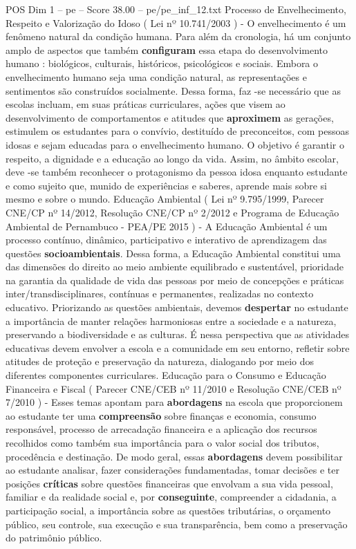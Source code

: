 \begin{textsample}{POS Dim 1 – pe – Score 38.00 – pe/pe\_inf\_12.txt}
Processo de Envelhecimento, Respeito e Valorização do Idoso ( Lei nº 10.741/2003 ) - O envelhecimento é um fenômeno natural da condição humana.
Para além da cronologia, há um conjunto amplo de aspectos que também \textbf{configuram} essa etapa do desenvolvimento humano : biológicos, culturais, históricos, psicológicos e sociais.
Embora o envelhecimento humano seja uma condição natural, as representações e sentimentos são construídos socialmente.
Dessa forma, faz -se necessário que as escolas incluam, em suas práticas curriculares, ações que visem ao desenvolvimento de comportamentos e atitudes que \textbf{aproximem} as gerações, estimulem os estudantes para o convívio, destituído de preconceitos, com pessoas idosas e sejam educadas para o envelhecimento humano.
O objetivo é garantir o respeito, a dignidade e a educação ao longo da vida.
Assim, no âmbito escolar, deve -se também reconhecer o protagonismo da pessoa idosa enquanto estudante e como sujeito que, munido de experiências e saberes, aprende mais sobre si mesmo e sobre o mundo.
Educação Ambiental ( Lei nº 9.795/1999, Parecer CNE/CP nº 14/2012, Resolução CNE/CP nº 2/2012 e Programa de Educação Ambiental de Pernambuco - PEA/PE 2015 ) - A Educação Ambiental é um processo contínuo, dinâmico, participativo e interativo de aprendizagem das questões \textbf{socioambientais}.
Dessa forma, a Educação Ambiental constitui uma das dimensões do direito ao meio ambiente equilibrado e sustentável, prioridade na garantia da qualidade de vida das pessoas por meio de concepções e práticas inter/transdisciplinares, contínuas e permanentes, realizadas no contexto educativo.
Priorizando as questões ambientais, devemos \textbf{despertar} no estudante a importância de manter relações harmoniosas entre a sociedade e a natureza, preservando a biodiversidade e as culturas.
É nessa perspectiva que as atividades educativas devem envolver a escola e a comunidade em seu entorno, refletir sobre atitudes de proteção e preservação da natureza, dialogando por meio dos diferentes componentes curriculares.
Educação para o Consumo e Educação Financeira e Fiscal ( Parecer CNE/CEB nº 11/2010 e Resolução CNE/CEB nº 7/2010 ) - Esses temas apontam para \textbf{abordagens} na escola que proporcionem ao estudante ter uma \textbf{compreensão} sobre finanças e economia, consumo responsável, processo de arrecadação financeira e a aplicação dos recursos recolhidos como também sua importância para o valor social dos tributos, procedência e destinação.
De modo geral, essas \textbf{abordagens} devem possibilitar ao estudante analisar, fazer considerações fundamentadas, tomar decisões e ter posições \textbf{críticas} sobre questões financeiras que envolvam a sua vida pessoal, familiar e da realidade social e, por \textbf{conseguinte}, compreender a cidadania, a participação social, a importância sobre as questões tributárias, o orçamento público, seu controle, sua execução e sua transparência, bem como a preservação do patrimônio público.

\end{textsample}
